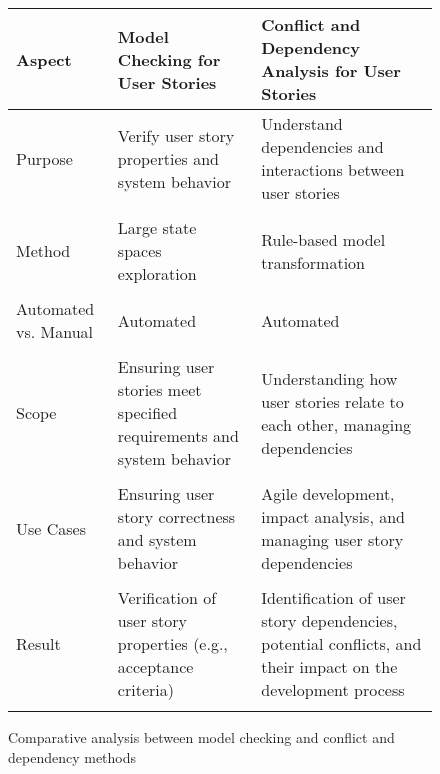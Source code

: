 \begin{figure}
\begingroup
\footnotesize
\centering
\begin{tabularx}{\textwidth}{l  X  X}
\hline
Aspect	&Model Checking for User Stories &	Conflict and Dependency Analysis for User Stories \\
\hline\hline
Purpose	&Verify user story properties and system behavior	&Understand dependencies and interactions between user stories \\\\ 
Method&	Large state spaces exploration&	Rule-based model transformation\\\\ 
Automated vs. Manual&	Automated	&Automated\\\\ 
Scope&	Ensuring user stories meet specified requirements and system behavior	&Understanding how user stories relate to each other, managing dependencies\\\\ 
Use Cases&	Ensuring user story correctness and system behavior	&Agile development, impact analysis, and managing user story dependencies\\\\ 
Result	&Verification of user story properties (e.g., acceptance criteria)	&Identification of user story dependencies, potential conflicts, and their impact on the development process\\\\ 
\hline
\end{tabularx}
\begin{TableCaption}
\caption{Comparative analysis between model checking and conflict and dependency methods}\label{tb:sec_6_comparative_analysis}
\end{TableCaption}
\endgroup
\end{figure}
